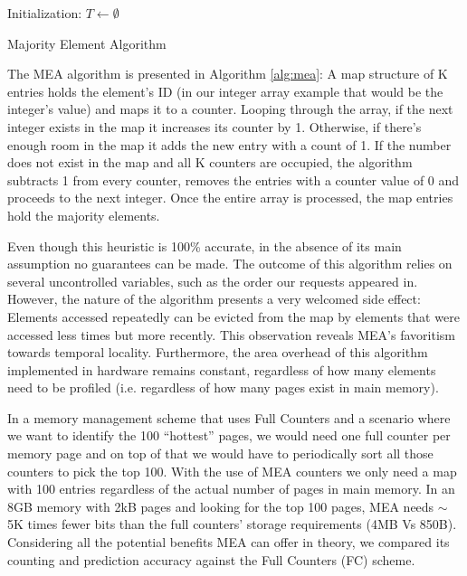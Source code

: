 \begin{algorithm}
 
 \DontPrintSemicolon
 \;
 \PrintSemicolon
 
 \DontPrintSemicolon
 \;
 Initialization: $T \leftarrow \emptyset$\; 
 \;
 \PrintSemicolon
  {
 }
 
 \caption{Majority Element Algorithm}
 \label{alg:mea}
\end{algorithm}


The MEA algorithm is presented in Algorithm \ref{alg:mea}: A map structure of K entries holds the element's ID (in our integer array example that would be the integer's value) and maps it to a counter. Looping through the array, if the next integer exists in the map it increases its counter by 1. Otherwise, if there's enough room in the map it adds the new entry with a count of 1. If the number does not exist in the map and all K counters are occupied, the algorithm subtracts 1 from every counter, removes the entries with a counter value of 0 and proceeds to the next integer. Once the entire array is processed, the map entries hold the majority elements.

Even though this heuristic is 100\% accurate, in the absence of its main assumption no guarantees can be made. The outcome of this algorithm relies on several uncontrolled variables, such as the order our requests appeared in. However, the nature of the algorithm presents a very welcomed side effect: Elements accessed repeatedly can be evicted from the map by elements that were accessed less times but more recently. This observation reveals MEA's favoritism towards temporal locality. Furthermore, the area overhead of this algorithm implemented in hardware remains constant, regardless of how many elements need to be profiled (i.e. regardless of how many pages exist in main memory). 

In a memory management scheme that uses Full Counters and a scenario where we want to identify the 100 ``hottest'' pages, we would need one full counter per memory page and on top of that we would have to periodically sort all those counters to pick the top 100. With the use of MEA counters we only need a map with 100 entries regardless of the actual number of pages in main memory. In an 8GB memory with 2kB pages and looking for the top 100 pages, MEA needs $\sim$5K times fewer bits than the full counters' storage requirements (4MB Vs 850B). Considering all the potential benefits MEA can offer in theory, we compared its counting and prediction accuracy against the Full Counters (FC) scheme. 

